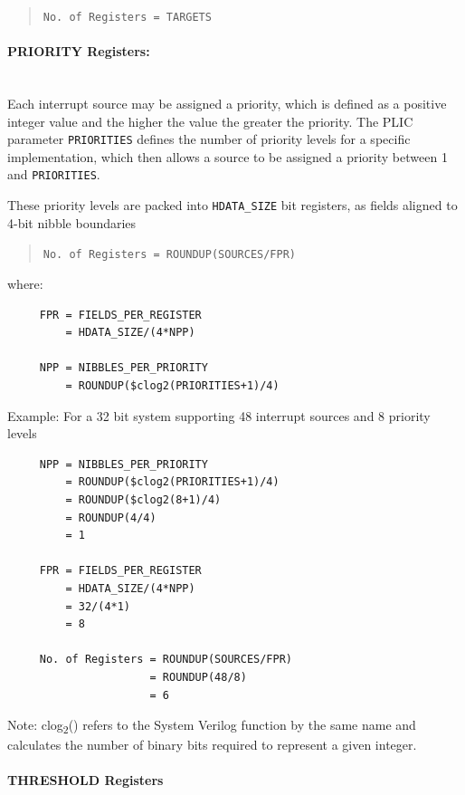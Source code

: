 \begin{quote}
\texttt{No.\ of\ Registers\ =\ TARGETS}
\end{quote}

\paragraph{PRIORITY Registers:} ~\\

Each interrupt source may be assigned a priority, which is defined as a positive integer value and the higher the value the greater the priority. The PLIC parameter \texttt{PRIORITIES} defines the number of priority levels for a specific implementation, which then allows a source to be assigned a priority between 1 and \texttt{PRIORITIES}.

These priority levels are packed into \texttt{HDATA\_SIZE} bit registers, as fields aligned to 4-bit nibble boundaries

\begin{quote}
	\texttt{No.\ of\ Registers\ =\ ROUNDUP(SOURCES/FPR)}
\end{quote}
where:
\indent
\begin{verbatim}
     FPR = FIELDS_PER_REGISTER    
         = HDATA_SIZE/(4*NPP)

     NPP = NIBBLES_PER_PRIORITY
         = ROUNDUP($clog2(PRIORITIES+1)/4)
\end{verbatim}

Example: For a 32 bit system supporting 48 interrupt sources and 8 priority levels

\begin{verbatim}
     NPP = NIBBLES_PER_PRIORITY
         = ROUNDUP($clog2(PRIORITIES+1)/4)
         = ROUNDUP($clog2(8+1)/4)
         = ROUNDUP(4/4)
         = 1

     FPR = FIELDS_PER_REGISTER
         = HDATA_SIZE/(4*NPP)
         = 32/(4*1)
         = 8
    
     No. of Registers = ROUNDUP(SOURCES/FPR)
                      = ROUNDUP(48/8)
                      = 6
\end{verbatim}

Note: clog\textsubscript{2}() refers to the System Verilog function by the same name and calculates the number of binary bits required to represent a given integer.

\paragraph{THRESHOLD Registers} ~\\

